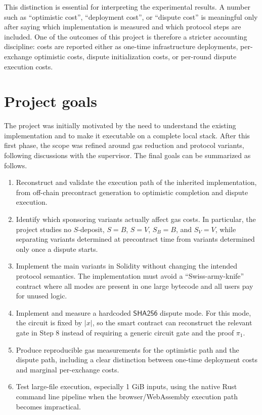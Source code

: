 This distinction is essential for interpreting the experimental results. A number such as
``optimistic cost'', ``deployment cost'', or ``dispute cost'' is meaningful only after saying
which implementation is measured and which protocol steps are included. One of the outcomes
of this project is therefore a stricter accounting discipline: costs are reported either as
one-time infrastructure deployments, per-exchange optimistic costs, dispute initialization
costs, or per-round dispute execution costs.

\section{Project goals}

The project was initially motivated by the need to understand the existing \sox{}
implementation and to make it executable on a complete local stack. After this first phase,
the scope was refined around gas reduction and protocol variants, following discussions with
the supervisor. The final goals can be summarized as follows.

\begin{enumerate}
  \item Reconstruct and validate the execution path of the inherited implementation, from
  off-chain precontract generation to optimistic completion and dispute execution.

  \item Identify which sponsoring variants actually affect gas costs. In particular, the
  project studies no \(S\)-deposit, \(S=B\), \(S=V\), \(S_B=B\), and \(S_V=V\), while
  separating variants determined at precontract time from variants determined only once a
  dispute starts.

  \item Implement the main variants in Solidity without changing the intended protocol
  semantics. The implementation must avoid a ``Swiss-army-knife'' contract where all modes
  are present in one large bytecode and all users pay for unused logic.

  \item Implement and measure a hardcoded \(\mathsf{SHA256}\) dispute mode. For this mode,
  the circuit is fixed by \(|x|\), so the smart contract can reconstruct the relevant gate in
  Step 8 instead of requiring a generic circuit gate and the proof \(\pi_1\).

  \item Produce reproducible gas measurements for the optimistic path and the dispute path,
  including a clear distinction between one-time deployment costs and marginal per-exchange
  costs.

  \item Test large-file execution, especially 1 GiB inputs, using the native Rust command
  line pipeline when the browser/WebAssembly execution path becomes impractical.
\end{enumerate}

